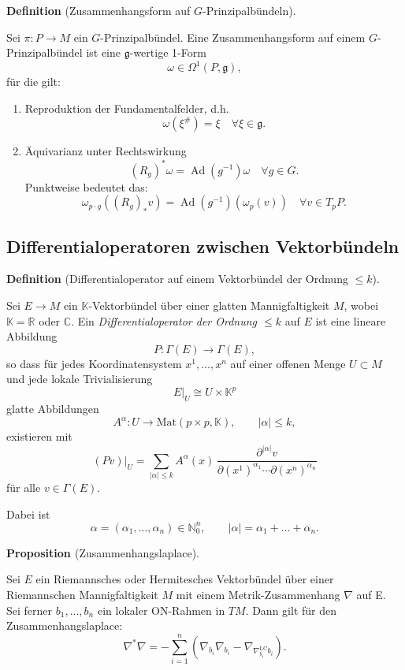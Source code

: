 \documentclass[10pt, letterpaper]{article}
\newcommand{\R}{\mathbb{R}}
\newcommand{\C}{\mathbb{C}}
\newcommand{\Mat}{\mathrm{Mat}}
\newcommand{\CustomHeading}[3]{%
  \par\medskip\noindent%
  \textbf{#1 #2} \textnormal{(#3)}.\enskip%
}
\newenvironment{DEF}[2]{\CustomHeading{Definition}{#1}{#2}}{}
\newenvironment{PROP}[2]{\CustomHeading{Proposition}{#1}{#2}}{}
\begin{document}
\begin{DEF}{}{Zusammenhangsform auf $G$-Prinzipalbündeln}
  Sei $\pi:P\to M$ ein $G$-Prinzipalbündel. Eine Zusammenhangsform auf einem $G$-Prinzipalbündel ist eine $\mathfrak{g}$-wertige 1-Form
  $$
  \omega \in \Omega^1(P, \mathfrak{g}),
  $$
  für die gilt:
  \begin{enumerate}
    \item Reproduktion der Fundamentalfelder, d.h. 
    $$
    \omega\left(\xi^{\#}\right)=\xi \quad \forall \xi \in \mathfrak{g} .
    $$
    \item Äquivarianz unter Rechtswirkung
    $$
    \left(R_g\right)^* \omega=\operatorname{Ad}\left(g^{-1}\right) \omega \quad \forall g \in G .
    $$
    Punktweise bedeutet das:
    $$
    \omega_{p \cdot g}\left(\left(R_g\right)_* v\right)=\operatorname{Ad}\left(g^{-1}\right)\left(\omega_p(v)\right) \quad \forall v \in T_p P .
    $$
  \end{enumerate}
\end{DEF}



\subsection{Differentialoperatoren zwischen Vektorbündeln}



\begin{DEF}{}{Differentialoperator auf einem Vektorbündel der Ordnung $\le k$}
Sei $E \to M$ ein $\mathbb{K}$-Vektorbündel über einer glatten Mannigfaltigkeit $M$,
wobei $\mathbb{K}=\R$ oder $\C$.
Ein \emph{Differentialoperator der Ordnung $\le k$} auf $E$ ist eine lineare Abbildung
\[
P:\Gamma(E)\to \Gamma(E),
\]
so dass für jedes Koordinatensystem $x^1,\dots,x^n$ auf einer offenen Menge
$U\subset M$ und jede lokale Trivialisierung
\[
E|_U \cong U\times \mathbb{K}^p
\]
glatte Abbildungen
\[
A^\alpha:U\to \Mat(p\times p,\mathbb{K}),
\qquad |\alpha|\le k,
\]
existieren mit
\[
(Pv)|_U
=
\sum_{|\alpha|\le k}
A^\alpha(x)\,
\frac{\partial^{|\alpha|}v}{\partial (x^1)^{\alpha_1}\cdots \partial (x^n)^{\alpha_n}}
\]
für alle $v\in \Gamma(E)$.

Dabei ist
\[
\alpha=(\alpha_1,\dots,\alpha_n)\in \mathbb N_0^n,
\qquad
|\alpha|=\alpha_1+\dots+\alpha_n.
\]
\end{DEF}

\begin{PROP}{\parencite[p.~110]{BaerSpin}}{Zusammenhangslaplace}
  Sei $E$ ein Riemannsches oder Hermitesches Vektorbündel über einer Riemannschen Mannigfaltigkeit $M$ mit einem Metrik-Zusammenhang $\nabla$ auf E. Sei ferner $b_1,...,b_n$ ein lokaler ON-Rahmen in $TM$. Dann gilt für den Zusammenhangslaplace:
    $$
    \nabla^* \nabla=-\sum_{i=1}^n\left(\nabla_{b_i} \nabla_{b_i}-\nabla_{\nabla_{b_i}^{\mathrm{LC}}b_i}\right) .
    $$
\end{PROP}
\end{document}
